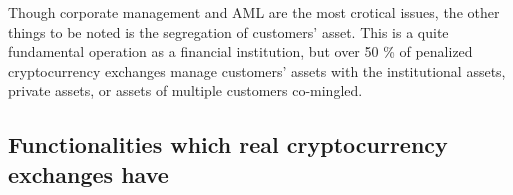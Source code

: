 %

Though corporate management and AML are the most crotical issues,
the other things to be noted is the segregation of customers' asset. This is a quite fundamental operation
as a financial institution, but over 50 \% of penalized cryptocurrency exchanges manage
customers' assets with the institutional assets, private assets, or assets of multiple customers co-mingled.

\subsection{Functionalities which real cryptocurrency exchanges have}

